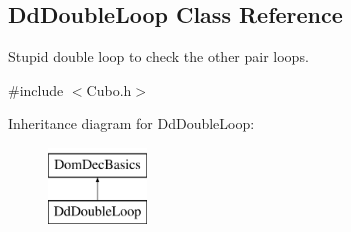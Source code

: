 \hypertarget{classDdDoubleLoop}{\subsection{\-Dd\-Double\-Loop \-Class \-Reference}
\label{classDdDoubleLoop}
}


\-Stupid double loop to check the other pair loops.  




{\ttfamily \#include $<$\-Cubo.\-h$>$}

\-Inheritance diagram for \-Dd\-Double\-Loop\-:\begin{figure}[H]
\begin{center}
\leavevmode
\includegraphics[height=2.000000cm]{classDdDoubleLoop}
\end{center}
\end{figure}
